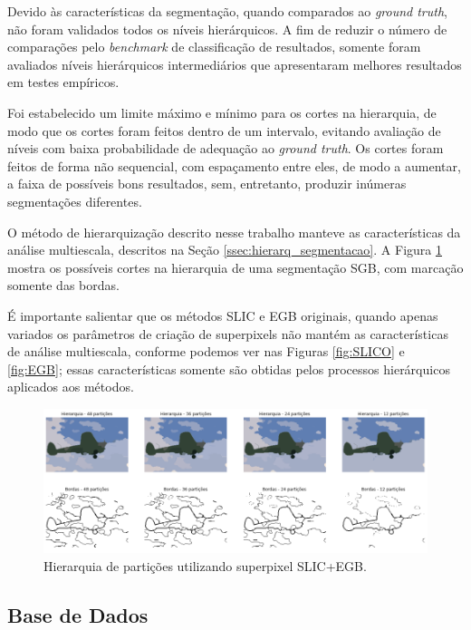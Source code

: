 \begin{document}
Devido às características da segmentação, quando comparados ao \textit{ground truth}, não foram validados todos os níveis hierárquicos. A fim de reduzir o número de comparações pelo \textit{benchmark} de classificação de resultados, somente foram avaliados níveis hierárquicos intermediários que apresentaram melhores resultados em testes empíricos. 

Foi estabelecido um limite máximo e mínimo para os cortes na hierarquia, de modo que os cortes foram feitos dentro de um intervalo, evitando avaliação de níveis com baixa probabilidade de adequação ao \textit{ground truth}. Os cortes foram feitos de forma não sequencial, com espaçamento entre eles, de modo a aumentar, a faixa de possíveis bons resultados, sem, entretanto, produzir inúmeras segmentações diferentes. 

O método de hierarquização descrito nesse trabalho manteve as características da análise multiescala, descritos na Seção \ref{ssec:hierarq_segmentacao}. A Figura \ref{fig:hierarq_partit} mostra os possíveis cortes na hierarquia de uma segmentação SGB, com marcação somente das bordas.

É importante salientar que os métodos SLIC e EGB originais, quando apenas variados os parâmetros de criação de superpixels não mantém as características de análise multiescala, conforme podemos ver nas Figuras \ref{fig:SLICO} e \ref{fig:EGB}; essas características somente são obtidas pelos processos hierárquicos aplicados aos métodos.

\begin{figure}[ht]
\centering
\includegraphics[width=1.\textwidth]{slic_hierarquia_particoes.png}
\caption{Hierarquia de partições utilizando superpixel SLIC+EGB.}
\label{fig:hierarq_partit}
\end{figure}


\subsection{Base de Dados} \label{ssec:base_dados}
\end{document}
